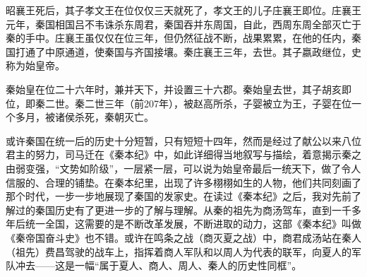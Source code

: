 \documentclass[12pt,a4paper]{ctexart}
\begin{document}
昭襄王死后，其子孝文王在位仅仅三天就死了，孝文王的儿子庄襄王即位。庄襄王元年，秦国相国吕不韦诛杀东周君，秦国吞并东周国，自此，西周东周全部灭亡于秦的手中。庄襄王虽仅仅在位三年，但仍然征战不断，战果累累，在他的任内，秦国打通了中原通道，使秦国与齐国接壤。秦庄襄王三年，去世。其子嬴政继位，史称为始皇帝。

秦始皇在位二十六年时，兼并天下，并设置三十六郡。秦始皇去世，其子胡亥即位，即秦二世。秦二世三年（前207年），被赵高所杀，子婴被立为王，子婴在位一个多月，被诸侯杀死，秦朝灭亡。

或许秦国在统一后的历史十分短暂，只有短短十四年，然而是经过了献公以来八位君主的努力，司马迁在《秦本纪》中，如此详细得当地叙写与描绘，着意揭示秦之由弱变强，“文势如阶级”，一层紧一层，可以说为始皇帝最后一统天下，做了令人信服的、合理的铺垫。在秦本纪里，出现了许多栩栩如生的人物，他们共同刻画了那个时代，一步一步地展现了秦国的发家史。在读过《秦本纪》之后，我对先前了解过的秦国历史有了更进一步的了解与理解。从秦的祖先为商汤驾车，直到一千多年后统一全国，这需要的是不断改革发展，不断进取的动力，这部《秦本纪》叫做《秦帝国奋斗史》也不错。或许在鸣条之战（商灭夏之战）中，商君成汤站在秦人（祖先）费昌驾驶的战车上，指挥着商人军队和以周人为代表的联军，向夏人的军队冲去——这是一幅“属于夏人、商人、周人、秦人的历史性同框”。
\end{document}
